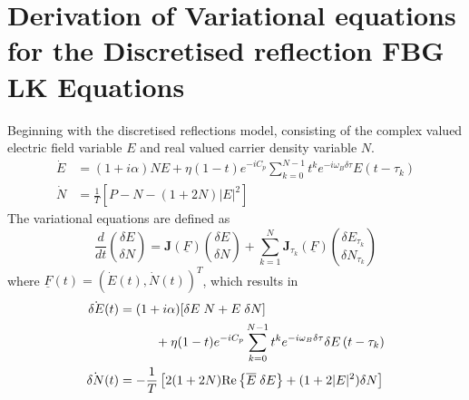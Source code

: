 \section{Derivation of Variational equations for the Discretised reflection FBG LK Equations}
\label{app:lyapunov}
%
Beginning with the discretised reflections model, consisting of the complex valued electric field variable $E$ and real valued carrier density variable $N$. 
\begin{align*}
\dot{E}&=(1+i \alpha) N E+\eta(1-t) e^{-i C_p} \sum_{k=0}^{N-1} t^{k} e^{-i \omega_B \delta \tau} E\left(t-\tau_k \right) \\
\dot{N}&=\frac{1}{T}\left[P-N-(1+2 N)|E|^{2}\right]
\end{align*}
%
The variational equations are defined as
%
\begin{equation}
    \frac{d}{d t}\binom{\delta E}{\delta N} = \mathbf{J}(\underline{F})\binom{\delta E}{\delta N} + \sum_{k=1}^{N}\mathbf{J}_{\tau_{k}}(\underline{F})\binom{\delta E_{\tau_{k}}}{\delta N_{\tau_{k}}}
\end{equation}
%
where $\underline{F}(t)=(\dot{E}(t), \dot{N}(t))^T$, which results in
%
\begin{gather}
\begin{aligned}
    \dot{\delta E}(t) &= (1+i \alpha)[\delta E \; N + E \; \delta N]\\
                &\hspace{1cm} + \eta(1-t) e^{-i C_p} \sum_{k=0}^{N-1} t^{k} e^{-i \omega_B \delta \tau} \delta E\left(t-\tau_{k}\right) \\
    \dot{\delta N}(t) &=-\frac{1}{T}\left[2(1+2 N) \text{Re}\left\{\overline{E} \; \delta E\right\} + (1+2|E|^{2} ) \delta N \right]
\end{aligned}
\end{gather}
